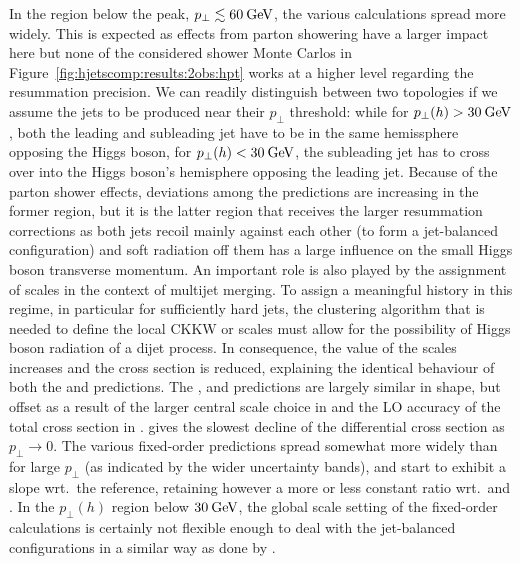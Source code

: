 In the region below the peak, $p_\perp\lesssim 60\text{\:GeV}$, the various
calculations spread more widely. This is expected as effects from
parton showering have a larger impact here but none of the considered
shower Monte Carlos in Figure~\ref{fig:hjetscomp:results:2obs:hpt}
works at a higher level regarding the resummation precision. We can
readily distinguish between two topologies if we assume the jets to be
produced near their $p_\perp$ threshold: while for
$p_\perp(h)>30\text{\:GeV}$, both the leading and subleading jet have to be in
the same hemissphere opposing the Higgs boson, for
$p_\perp(h)<30\text{\:GeV}$, the subleading jet has to cross over into the
Higgs boson's hemisphere opposing the leading jet.
Because of the parton shower effects, deviations among the predictions
are increasing in the former region, but it is the latter region that
receives the larger resummation corrections as both jets recoil mainly
against each other (to form a jet-balanced configuration) and soft
radiation off them has a large influence on the small Higgs boson
transverse momentum. An important role is also played by the
assignment of scales in the context of multijet merging.
To assign a meaningful history in this regime, in particular
for sufficiently hard jets, the clustering algorithm that is needed to
define the local CKKW or \Minlo scales must allow for the possibility
of Higgs boson radiation of a dijet process. In consequence, the value
of the scales increases and the cross section is reduced, explaining
the identical behaviour of both the \Sherpa \MEPSatNLO and \Sherpa
\NNLOPS predictions.
The \Herwig, \MGaMC and \Hej predictions are largely similar in shape,
but offset as a result of the larger central scale choice in \MGaMC
and the LO accuracy of the total cross section in \Hej. \Powheg
\NNLOPS gives the slowest decline of the differential cross section as
$p_\perp\to0$.
The various fixed-order predictions spread somewhat more widely than
for large $p_\perp$ (as indicated by the wider uncertainty bands), and
start to exhibit a slope wrt.~the \Powheg reference, retaining however
a more or less constant ratio wrt.~\Herwig and \MGaMC. In the
$p_\perp(h)$ region below $30\text{\:GeV}$, the global scale setting of the
fixed-order calculations is certainly not flexible enough to deal with
the jet-balanced configurations in a similar way as done by \Sherpa.


